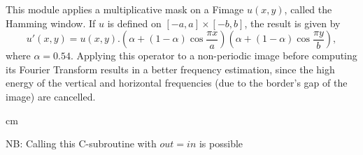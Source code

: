 This module applies a multiplicative mask on a Fimage $u(x,y)$, called 
the Hamming window. If $u$ is defined on $[-a,a] \times [-b,b]$, 
the result is given by
$$u'(x,y) = u(x,y) . \left( \alpha + (1-\alpha) \cos \frac{\pi x}{a} \right)
\left( \alpha + (1-\alpha) \cos \frac{\pi y}{b} \right),$$
where $\alpha = 0.54$.
Applying this operator to a non-periodic image before computing its Fourier
Transform results in a better frequency estimation, since the high energy
of the vertical and horizontal frequencies (due to the border's gap of 
the image) are cancelled.

 cm

NB: Calling this C-subroutine with $out=in$ is possible